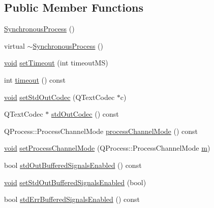 \subsection*{\-Public \-Member \-Functions}
\begin{DoxyCompactItemize}
\item 
\hyperlink{class_utils_1_1_synchronous_process_a1ad1fb5d4ed654d6b935da607a51b75a}{\-Synchronous\-Process} ()
\item 
virtual \hyperlink{class_utils_1_1_synchronous_process_a3d8f54e636d04ba52260597a64083f59}{$\sim$\-Synchronous\-Process} ()
\item 
\hyperlink{group___u_a_v_objects_plugin_ga444cf2ff3f0ecbe028adce838d373f5c}{void} \hyperlink{class_utils_1_1_synchronous_process_a669414ec72605e9f1e830e01f558593f}{set\-Timeout} (int timeout\-M\-S)
\item 
int \hyperlink{class_utils_1_1_synchronous_process_ad196c7f93892fdd7f8b74d7e7f387fbe}{timeout} () const 
\item 
\hyperlink{group___u_a_v_objects_plugin_ga444cf2ff3f0ecbe028adce838d373f5c}{void} \hyperlink{class_utils_1_1_synchronous_process_a5588eca6d2cf9537996f9a7eb354084d}{set\-Std\-Out\-Codec} (\-Q\-Text\-Codec $\ast$c)
\item 
\-Q\-Text\-Codec $\ast$ \hyperlink{class_utils_1_1_synchronous_process_a5824e27f2b8741a7ff7e60968802b95e}{std\-Out\-Codec} () const 
\item 
\-Q\-Process\-::\-Process\-Channel\-Mode \hyperlink{class_utils_1_1_synchronous_process_aedcc86a40ce89c41e0e7172568840555}{process\-Channel\-Mode} () const 
\item 
\hyperlink{group___u_a_v_objects_plugin_ga444cf2ff3f0ecbe028adce838d373f5c}{void} \hyperlink{class_utils_1_1_synchronous_process_a4469209be90a8c4a6cc8f697efd7328c}{set\-Process\-Channel\-Mode} (\-Q\-Process\-::\-Process\-Channel\-Mode \hyperlink{uavobjecttemplate_8m_ab3cd915d758008bd19d0f2428fbb354a}{m})
\item 
bool \hyperlink{class_utils_1_1_synchronous_process_a070364f08bbcbcb85902da3263235bc6}{std\-Out\-Buffered\-Signals\-Enabled} () const 
\item 
\hyperlink{group___u_a_v_objects_plugin_ga444cf2ff3f0ecbe028adce838d373f5c}{void} \hyperlink{class_utils_1_1_synchronous_process_a697036d9d4d71ae25f018beff36bd790}{set\-Std\-Out\-Buffered\-Signals\-Enabled} (bool)
\item 
bool \hyperlink{class_utils_1_1_synchronous_process_aaa756ec7b46e9c0ed210de1b45138958}{std\-Err\-Buffered\-Signals\-Enabled} () const 

\end{DoxyCompactItemize}
